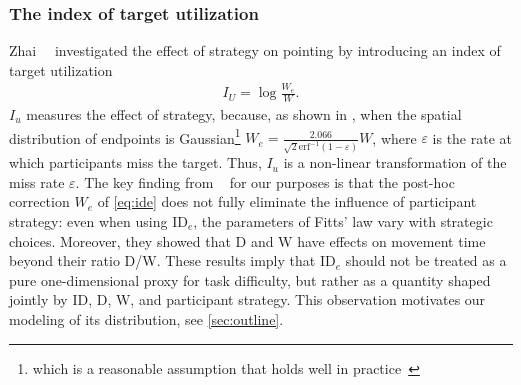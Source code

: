 \documentclass[acmlarge, manuscript,review]{acmart}
\newcommand{\ide}{\ensuremath{{\text{ID}_e}}\xspace}
\begin{document}
\subsubsection{The index of target utilization\label{subs:background::target_util}}
Zhai~\etal~\cite{zhai2004nominal} investigated the effect of strategy on pointing by introducing an index of target utilization
\begin{align}
	I_U = \log \frac{W_e}{W}.
\end{align}
$I_u$ measures the effect of strategy, because, as shown in \cite[Appendix 3]{gori2018tochi}, when the spatial distribution of endpoints is Gaussian\footnote{which is a reasonable assumption that holds well in practice~\cite{soukoreff2004, gori2020}} $W_e = \frac{2.066}{\sqrt{2}\text{erf}^{-1}(1-\varepsilon)} W$, where $\varepsilon$ is the rate at which participants miss the target. Thus, $I_u$ is a non-linear transformation of the miss rate $\varepsilon$. 
The key finding from \citeauthor{zhai2004nominal}~\cite{zhai2004nominal} for our purposes is that the post-hoc correction $W_e$ of \autoref{eq:ide} does not fully eliminate the influence of participant strategy: even when using \ide, the parameters of Fitts' law vary with strategic choices. Moreover, they showed that D and W have effects on movement time beyond their ratio D/W. These results imply that \ide should not be treated as a pure one-dimensional proxy for task difficulty, but rather as a quantity shaped jointly by ID, D, W, and participant strategy. This observation motivates our modeling of its distribution, see \autoref{sec:outline}.
\end{document}
